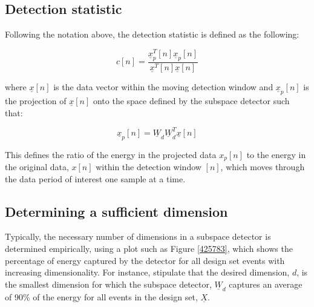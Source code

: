 \subsection{Detection statistic}
Following the notation above, the detection statistic is defined as the following:

\begin{equation}
c[n] = \frac{\underline{x}_{p}^{T}[n]\underline{x}_{p}[n]}{\underline{x}^{T}[n]\underline{x}[n]}
\end{equation}

where $\underline{x}[n]$ is the data vector within the moving detection window and $\underline{x}_{p}[n]$ is the projection of $\underline{x}[n]$ onto the space defined by the subspace detector such that:

\begin{equation}
\underline{x}_{p}[n] = \underline{W}_{d}\underline{W}_{d}^{T}\underline{x}[n]
\end{equation}

This defines the ratio of the energy in the projected data $x_{p}[n]$ to the energy in the original data, $x[n]$ within the detection window $[n]$, which moves through the data period of interest one sample at a time.

\subsection{Determining a sufficient dimension}
Typically, the necessary number of dimensions in a subspace detector is determined empirically, using a plot such as Figure \ref{425783}, which shows the percentage of energy captured by the detector for all design set events with increasing dimensionality. For instance, \citet{Chambers_2015} stipulate that the desired dimension, $d$, is the smallest dimension for which the subspace detector, $\underline{W}_{d}$ captures an average of 90\% of the energy for all events in the design set, $\underline{X}$.

